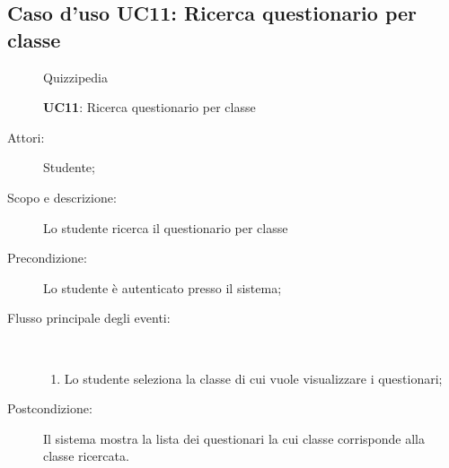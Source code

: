\subsection{Caso d'uso UC11: Ricerca questionario per classe}
	\begin{figure}[H]
		\centering
		\begin{resizedtikzpicture}{\textwidth}
		\begin{umlsystem}[x=0, fill=lightgray!20]{Quizzipedia}
		\end{umlsystem}
		\end{resizedtikzpicture}
		\caption{\textbf{UC11}: Ricerca questionario per classe}
		\label{UC11}
	\end{figure}
\begin{description}
\item[Attori:] Studente;
\item[Scopo e descrizione:] Lo studente ricerca il questionario per classe
      \item[Precondizione:] Lo studente è autenticato presso il sistema;

        \item[Flusso principale degli eventi:] \ 
 \begin{enumerate}
          \item Lo studente seleziona la classe di cui vuole visualizzare i questionari;

      \end{enumerate}
    \item[Postcondizione:] Il sistema mostra la lista dei questionari la cui classe corrisponde alla classe ricercata.
  \end{description}
\hypertarget{UC12}{}
